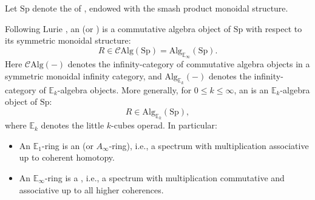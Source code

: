 \begin{definition} \label{definition:commutative_ring_spectrum_in_stable_inf_category}
    Let $\mathrm{Sp}$ denote the  of , endowed with the smash product monoidal structure.

    Following Lurie \cite[Definition 7.1.0.1]{lurie_ha}, an  (or ) is a commutative algebra object of $\mathrm{Sp}$ with respect to its symmetric monoidal structure:
    $$ R \in \mathcal{C}\mathrm{Alg}(\mathrm{Sp}) = \mathrm{Alg}_{\mathbb{E}_\infty}(\mathrm{Sp}). $$
    Here $\mathcal{C}\mathrm{Alg}(-)$ denotes the infinity-category of commutative algebra objects in a symmetric monoidal infinity category, and $\mathrm{Alg}_{\mathbb{E}_k}(-)$ denotes the infinity-category of $\mathbb{E}_k$-algebra objects. More generally, for $0 \leq k \leq \infty$, an  is an $\mathbb{E}_k$-algebra object of $\mathrm{Sp}$:
    $$ R \in \mathrm{Alg}_{\mathbb{E}_k}(\mathrm{Sp}), $$
    where $\mathbb{E}_k$ denotes the little $k$-cubes operad. In particular:
    \begin{itemize}
        \item An $\mathbb{E}_1$-ring is an  (or $A_\infty$-ring), i.e., a spectrum with multiplication associative up to coherent homotopy.
        \item An $\mathbb{E}_\infty$-ring is a , i.e., a spectrum with multiplication commutative and associative up to all higher coherences.
    \end{itemize}


\end{definition}
